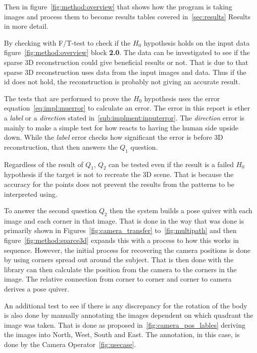 Then in figure~\ref{fig:method:overview} that shows how the program is taking images and process them to become results tables covered in~\ref{sec:results} Results in more detail.

By checking with F/T-test to check if the $H_0$ hypothesis holds on the input data figure~\ref{fig:method:overview} block \textbf{2.0}.
The data can be investigated to see if the sparse 3D reconstruction could give beneficial results or not.
That is due to that sparse 3D reconstruction uses data from the input images and data.
Thus if the id does not hold, the reconstruction is probably not giving an accurate result.

The tests that are performed to prove the $H_0$ hypothesis uses the error equation~\ref{eq:impl:muerror} to calculate an error.
The error in this report is ether a \textit{label} or a \textit{direction} stated in~\ref{sub:implment:inputerror}.
The \textit{direction} error is mainly to make a simple test for how \openpose{ } reacts to having the human side upside down.
While the \textit{label} error checks how significant the error is before 3D reconstruction, that then answers the $Q_1$ question.

Regardless of the result of $Q_1$, $Q_2$  can be tested even if the result is a failed $H_0$ hypothesis if the target is not to recreate the 3D scene.
That is because the accuracy for the points does not prevent the results from the \arcuo{ } patterns to be interpreted using.

To answer the second question $Q_2$ then the system builds a pose quiver with each image and each corner in that image.
That is done in the way that was done is primarily shown in Figures~\ref{fig:camera_transfer} to~\ref{fig:multipath} and then figure~\ref{fig:method:sparce3d} expands this with a process to how this works in sequence.
However, the initial process for recovering the camera positions is done by using \aruco{ } corners spread out around the subject.
That is then done with the \aruco{ } library can then calculate the position from the camera to the \acuro{ } corners in the image.
The relative connection from corner to corner and corner to camera derives a pose quiver.

An additional test to see if there is any discrepancy for the rotation of the body is also done by manually annotating the images dependent on which quadrant
the image was taken.
That is done as proposed in~\ref{fig:camera_pos_lables} deriving the images into North, West, South and East.
The annotation, in this case, is done by the Camera Operator~\ref{fig:usecase}.





